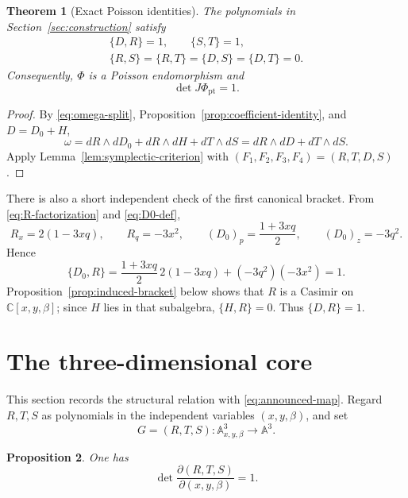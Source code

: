 \documentclass[11pt]{article}
\newcommand{\C}{\mathbb C}
\newcommand{\Aff}{\mathbb A}
\newtheorem{theorem}{Theorem}[section]
\newtheorem{proposition}[theorem]{Proposition}
\theoremstyle{remark}
\begin{document}
\begin{theorem}[Exact Poisson identities]\label{thm:poisson-identities}
The polynomials in Section~\ref{sec:construction} satisfy
\begin{equation}\label{eq:six-brackets}
\begin{gathered}
  \{D,R\}=1,\qquad \{S,T\}=1,\\
  \{R,S\}=\{R,T\}=\{D,S\}=\{D,T\}=0.
\end{gathered}
\end{equation}
Consequently, \(\Phi\) is a Poisson endomorphism and
\begin{equation}\label{eq:Phi-det-one}
  \det J\Phi_{\mathrm{pt}}=1.
\end{equation}
\end{theorem}

\begin{proof}
By \eqref{eq:omega-split}, Proposition~\ref{prop:coefficient-identity}, and
\(D=D_0+H\),
\[
  \omega
  =dR\wedge dD_0+dR\wedge dH+dT\wedge dS
  =dR\wedge dD+dT\wedge dS.
\]
Apply Lemma~\ref{lem:symplectic-criterion} with
\((F_1,F_2,F_3,F_4)=(R,T,D,S)\).
\end{proof}

There is also a short independent check of the first canonical bracket.  From
\eqref{eq:R-factorization} and \eqref{eq:D0-def},
\[
  R_x=2(1-3xq),\qquad R_q=-3x^2,
  \qquad
  (D_0)_p=\frac{1+3xq}{2},\qquad (D_0)_z=-3q^2.
\]
Hence
\begin{equation}\label{eq:D0R-direct}
  \{D_0,R\}
  =\frac{1+3xq}{2}\,2(1-3xq)+(-3q^2)(-3x^2)=1.
\end{equation}
Proposition~\ref{prop:induced-bracket} below shows that \(R\) is a Casimir on
\(\C[x,y,\beta]\); since \(H\) lies in that subalgebra, \(\{H,R\}=0\).
Thus \(\{D,R\}=1\).

\section{The three-dimensional core}\label{sec:three-dimensional-core}

This section records the structural relation with
\eqref{eq:announced-map}.  Regard \(R,T,S\) as polynomials in the independent
variables \((x,y,\beta)\), and set
\begin{equation}\label{eq:G-core}
  G=(R,T,S):\Aff^3_{x,y,\beta}\longrightarrow\Aff^3.
\end{equation}

\begin{proposition}\label{prop:core-jacobian}
One has
\begin{equation}\label{eq:core-jacobian}
  \det\frac{\partial(R,T,S)}{\partial(x,y,\beta)}=1.
\end{equation}
\end{proposition}
\end{document}
